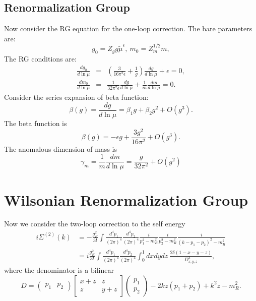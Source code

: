 \subsection{Renormalization Group}
Now consider the RG equation for the one-loop correction. 
The bare parameters are:
\begin{equation}
	g_0 = Z_g g\tilde{\mu}^{\epsilon},\ 
	m_0 = Z_m^{1/2} m,
\end{equation}
The RG conditions are:
\begin{eqnarray}
	\frac{d g_0}{d\ln \mu}
	&=& \left(\frac{3}{16\pi^2 \epsilon} + \frac{1}{g}\right)\frac{dg}{d\ln \mu} + \epsilon = 0, \\
	\frac{d m_0}{d\ln \mu}
	&=& \frac{1}{32\pi^2 \epsilon}\frac{dg}{d\ln \mu} + \frac{1}{m}\frac{dm}{d \ln \mu} = 0.
\end{eqnarray}
Consider the series expansion of beta function:
\begin{equation}
	\beta(g) = \frac{dg}{d\ln \mu} = \beta_1 g + \beta_2 g^2 +O(g^3).
\end{equation}
The beta function is
\begin{equation}
	\beta(g) = -\epsilon g + \frac{3g^2}{16\pi^2} + O(g^3).
\end{equation}
The anomalous dimension of mass is
\begin{equation}
	\gamma_m = \frac{1}{m}\frac{dm}{d \ln \mu} = \frac{g}{32\pi^2}+O(g^2)
\end{equation}

\section{Wilsonian Renormalization Group}
Now we consider the two-loop correction to the self energy
\begin{equation}
\begin{aligned}
	i\Sigma^{(2)}(k) 
	&= -\frac{g_R^2}{3!} \int \frac{d^4 p_1}{(2\pi)^4}\frac{d^4 p_2}{(2\pi)^4} \frac{i}{p_1^2-m_R^2} \frac{i}{p_2^2-m_R^2} \frac{i}{(k-p_1-p_2)^2-m_R^2} \\
	&= i\frac{g_R^2}{3!} \int \frac{d^4 p_1}{(2\pi)^4}\frac{d^4 p_2}{(2\pi)^4} \int_0^1 dx dy dz\  \frac{2 \delta(1-x-y-z) }{D_{x,y,z}^3},
\end{aligned}
\end{equation}
where the denominator is a bilinear
\begin{equation}
	D = \left(\begin{array}{cc} p_1 & p_2 \end{array} \right) 
		\left[\begin{array}{cc} x+z & z \\ z & y+z \end{array} \right]
		\left(\begin{array}{c} p_1 \\ p_2 \end{array} \right) 
		- 2kz (p_1 + p_2) + k^2z - m_R^2.
\end{equation}

